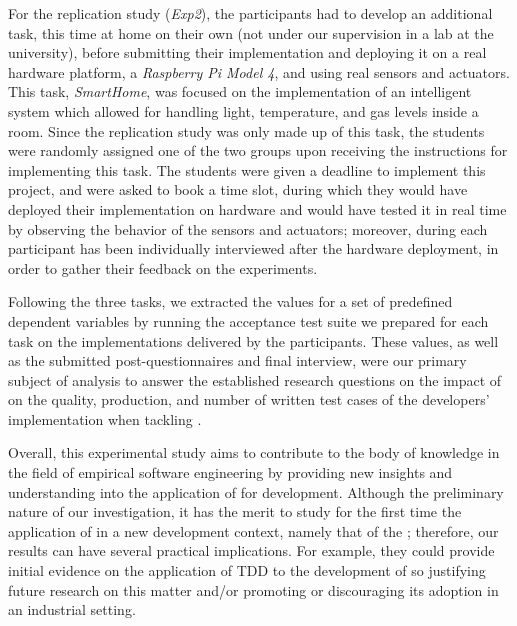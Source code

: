 For the replication study (\textit{Exp2}), the participants had to develop an additional task, this time at home on their own (\ie not under our supervision in a lab at the university), before submitting their implementation and deploying it on a real hardware platform, a \textit{Raspberry Pi Model 4}, and using real sensors and actuators. This task, \textit{SmartHome}, was focused on the implementation of an intelligent system which allowed for handling light, temperature, and gas levels inside a room.
Since the replication study was only made up of this task, the students were randomly assigned one of the two groups upon receiving the instructions for implementing this task.
The students were given a deadline to implement this project, and were asked to book a time slot, during which they would have deployed their implementation on hardware and would have tested it in real time by observing the behavior of the sensors and actuators; moreover, during each participant has been individually interviewed after the hardware deployment, in order to gather their feedback on the experiments.

Following the three tasks, we extracted the values for a set of predefined dependent variables by running the acceptance test suite we prepared for each task on the implementations delivered by the participants. These values, as well as the submitted post-questionnaires and final interview, were our primary subject of analysis to answer the established research questions on the impact of \tdd on the quality, production, and number of written test cases of the developers' implementation when tackling \ess.

Overall, this experimental study aims to contribute to the body of knowledge in the field of empirical software engineering by providing new insights and understanding into the application of \tdd for \es development.
Although the preliminary nature of our investigation, it has the merit to study for the first time the application of \tdd in a new development context, namely that of the \ess; therefore, our results can have several practical implications. For example, they could provide initial evidence on the application of TDD to the development of \ess so justifying future research on this matter and/or promoting or discouraging its adoption in an industrial setting.



